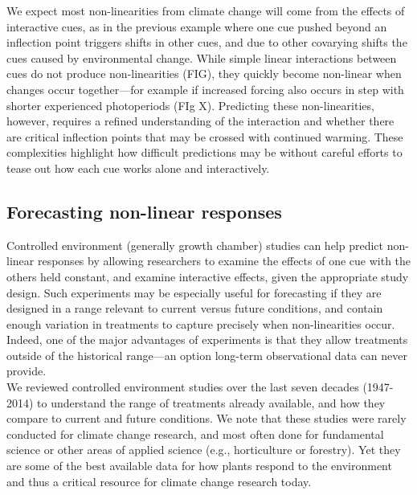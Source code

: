 \documentclass[11pt,letter]{article}
\begin{document}
We expect most non-linearities from climate change will come from the effects of interactive cues, as in the previous example where one cue pushed beyond an inflection point triggers shifts in other cues, and due to other covarying shifts the cues caused by environmental change. While simple linear interactions between cues do not produce non-linearities (FIG), they quickly become non-linear when changes occur together---for example if increased forcing also occurs in step with shorter experienced photoperiods (FIg X). Predicting these non-linearities, however, requires a refined understanding of the interaction and whether there are critical inflection points that may be crossed with continued warming. These complexities highlight how difficult predictions may be without careful efforts to tease out how each cue works alone and interactively. \\ 

\subsection{Forecasting non-linear responses} %
Controlled environment (generally growth chamber) studies can help predict non-linear responses by allowing researchers to examine the effects of one cue with the others held constant, and examine interactive effects, given the appropriate study design. Such experiments may be especially useful for forecasting if they are designed in a range relevant to current versus future conditions, and contain enough variation in treatments to capture precisely when non-linearities occur. Indeed, one of the major advantages of experiments is that they allow treatments outside of the historical range---an option long-term observational data can never provide. \\

We reviewed controlled environment studies over the last seven decades (1947-2014) to understand the range of treatments already available, and how they compare to current and future conditions. We note that these studies were rarely conducted for climate change research, and most often done for fundamental science or other areas of applied science (e.g., horticulture or forestry). Yet they are some of the best available data for how plants respond to the environment and thus a critical resource for climate change research today.\\
\end{document}

